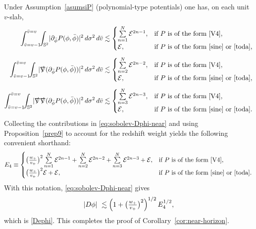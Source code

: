 \documentclass[11pt]{article}
\numberwithin{equation}{section}
\theoremstyle{plain}
\theoremstyle{definition}
\theoremstyle{remark}
\newcommand{\vplus}{v_{+}}
\newcommand{\wplus}{w_{+}}
\begin{document}
Under Assumption~\ref{asumsiP} (polynomial-type potentials) one has, on each unit $v$-slab,
\begin{eqnarray}
\int_{\bar{v}=v-1}^{\bar{v}=v}\!\!\int_{\mathbb S^{2}}\!|\partial_{\bar\phi}P(\phi,\bar\phi)|^{2}\,d\sigma^{2}\,d\bar v
&\lesssim
\begin{cases}
\sum\limits_{n=1}^{N}\mathcal{E}^{2n-1}, & \text{if $P$ is of the form \eqref{V4}},\\[2pt]
\mathcal{E}, & \text{if $P$ is of the form \eqref{sine} or \eqref{toda}},
\end{cases}\\[4pt]
\int_{\bar{v}=v-1}^{\bar{v}=v}\!\!\int_{\mathbb S^{2}}\!|\slashed{\nabla}(\partial_{\bar\phi}P(\phi,\bar\phi))|^{2}\,d\sigma^{2}\,d\bar v
&\lesssim
\begin{cases}
\sum\limits_{n=2}^{N}\mathcal{E}^{2n-2}, & \text{if $P$ is of the form \eqref{V4}},\\[2pt]
\mathcal{E}, & \text{if $P$ is of the form \eqref{sine} or \eqref{toda}},
\end{cases}\\[4pt]
\int_{\bar{v}=v-1}^{\bar{v}=v}\!\!\int_{\mathbb S^{2}}\!|\slashed{\nabla}\slashed{\nabla}(\partial_{\bar\phi}P(\phi,\bar\phi))|^{2}\,d\sigma^{2}\,d\bar v
&\lesssim
\begin{cases}
\sum\limits_{n=3}^{N}\mathcal{E}^{2n-3}, & \text{if $P$ is of the form \eqref{V4}},\\[2pt]
\mathcal{E}, & \text{if $P$ is of the form \eqref{sine} or \eqref{toda}}.
\end{cases}
\end{eqnarray}
Collecting the contributions in \eqref{eq:sobolev-Dphi-near} and using Proposition~\ref{prep9} to account for the redshift weight yields the following convenient shorthand:
\begin{equation}\label{E4}
 E_4\equiv
\begin{cases}
\bigl( \frac{\wplus}{\vplus} \bigr)^{2}\sum\limits_{n=1}^{N}\mathcal{E}^{2n-1}+\sum\limits_{n=2}^{N}\mathcal{E}^{2n-2}+\sum\limits_{n=3}^{N}\mathcal{E}^{2n-3}+\mathcal{E}, & \text{if $P$ is of the form \eqref{V4}},\\
 \bigl( \frac{\wplus}{\vplus} \bigr)^{2}{\mathcal{E}}+{\mathcal{E}}, &\text{if $P$ is of the form \eqref{sine} or \eqref{toda}}.
\end{cases}
\end{equation}
With this notation, \eqref{eq:sobolev-Dphi-near} gives
\begin{equation}\label{nabnearphi}
|D\phi|
\ \lesssim
\Bigl(1+\bigl(\tfrac{\wplus}{\vplus}\bigr)^{2}\Bigr)^{1/2}\,E_{4}^{1/2},
\end{equation}
which is \eqref{Dephi}. This completes the proof of Corollary~\ref{cor:near-horizon}.
\end{document}
